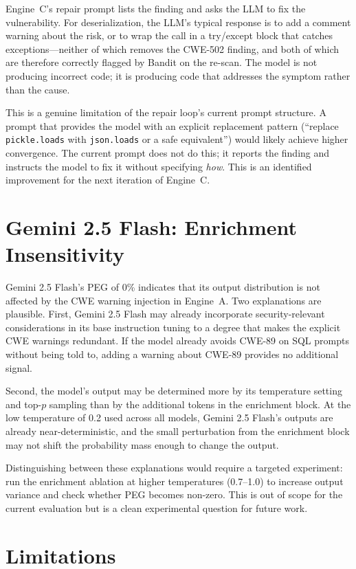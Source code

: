 \documentclass[12pt,a4paper]{report}
\begin{document}
Engine~C's repair prompt lists the finding and asks the LLM to fix the
vulnerability. For deserialization, the LLM's typical response is to add a
comment warning about the risk, or to wrap the call in a try/except block that
catches exceptions---neither of which removes the CWE-502 finding, and both of
which are therefore correctly flagged by Bandit on the re-scan. The model is not
producing incorrect code; it is producing code that addresses the symptom rather
than the cause.

This is a genuine limitation of the repair loop's current prompt structure. A
prompt that provides the model with an explicit replacement pattern (``replace
\texttt{pickle.loads} with \texttt{json.loads} or a safe equivalent'') would
likely achieve higher convergence. The current prompt does not do this; it
reports the finding and instructs the model to fix it without specifying
\emph{how}. This is an identified improvement for the next iteration of Engine~C.

\section{Gemini 2.5 Flash: Enrichment Insensitivity}
\label{sec:discgemini}

Gemini 2.5 Flash's PEG of 0\% indicates that its output distribution is not
affected by the CWE warning injection in Engine~A. Two explanations are
plausible. First, Gemini 2.5 Flash may already incorporate security-relevant
considerations in its base instruction tuning to a degree that makes the
explicit CWE warnings redundant. If the model already avoids CWE-89 on SQL
prompts without being told to, adding a warning about CWE-89 provides no
additional signal.

Second, the model's output may be determined more by its temperature setting
and top-$p$ sampling than by the additional tokens in the enrichment block.
At the low temperature of 0.2 used across all models, Gemini 2.5 Flash's
outputs are already near-deterministic, and the small perturbation from the
enrichment block may not shift the probability mass enough to change the output.

Distinguishing between these explanations would require a targeted experiment:
run the enrichment ablation at higher temperatures (0.7--1.0) to increase output
variance and check whether PEG becomes non-zero. This is out of scope for the
current evaluation but is a clean experimental question for future work.

\section{Limitations}
\label{sec:limitations}
\end{document}
